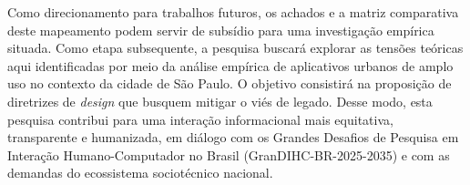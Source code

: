 \documentclass[12pt]{article}
\begin{document}
    Como direcionamento para trabalhos futuros, os achados e a matriz comparativa deste mapeamento podem servir de subsídio para uma investigação empírica situada. Como etapa subsequente, a pesquisa buscará explorar as tensões teóricas aqui identificadas por meio da análise empírica de aplicativos urbanos de amplo uso no contexto da cidade de São Paulo. O objetivo consistirá na proposição de diretrizes de \textit{design} que busquem mitigar o viés de legado. Desse modo, esta pesquisa contribui para uma interação informacional mais equitativa, transparente e humanizada, em diálogo com os Grandes Desafios de Pesquisa em Interação Humano-Computador no Brasil (GranDIHC-BR-2025-2035) e com as demandas do ecossistema sociotécnico nacional.



\end{document}
